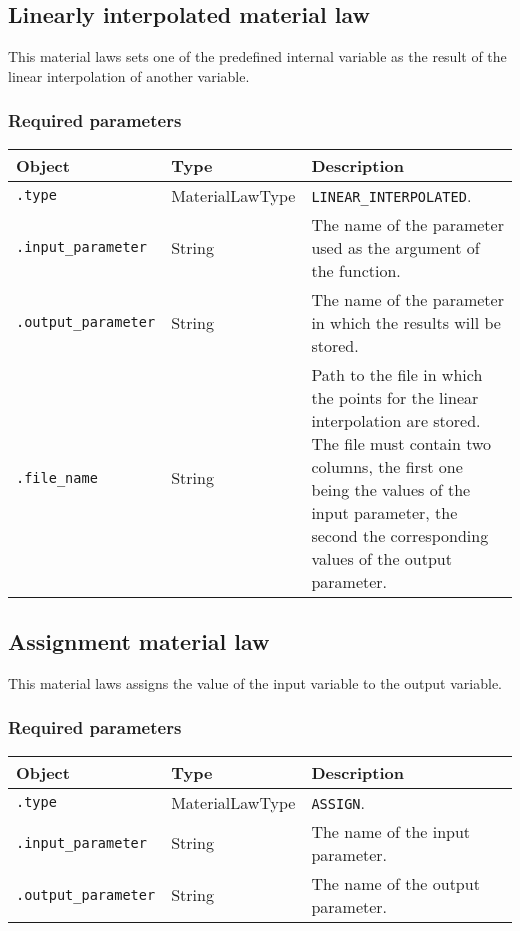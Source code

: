 \documentclass[10pt]{article}
\begin{document}
\subsection{Linearly interpolated material law}

This material laws sets one of the predefined internal variable as the result of the linear interpolation of another variable.

\subsubsection*{Required parameters}

\begin{tabularx}{\textwidth}{llX}
\hline 
Object & Type & Description \\ 
\hline 
\verb+.type+ & MaterialLawType & \verb+LINEAR_INTERPOLATED+. \\ 
\verb+.input_parameter+ & String & The name of the parameter used as the argument of the function.\\
\verb+.output_parameter+ & String & The name of the parameter in which the results will be stored.\\
\verb+.file_name+ & String & Path to the file in which the points for the linear interpolation are stored. The file must contain two columns, the first one being the values of the input parameter, the second the corresponding values of the output parameter.\\
\hline 
\end{tabularx}

\subsection{Assignment material law}

This material laws assigns the value of the input variable to the output variable.

\subsubsection*{Required parameters}

\begin{tabularx}{\textwidth}{llX}
\hline 
Object & Type & Description \\ 
\hline 
\verb+.type+ & MaterialLawType & \verb+ASSIGN+. \\ 
\verb+.input_parameter+ & String & The name of the input parameter.\\
\verb+.output_parameter+ & String & The name of the output parameter.\\
\hline 
\end{tabularx}
\end{document}
